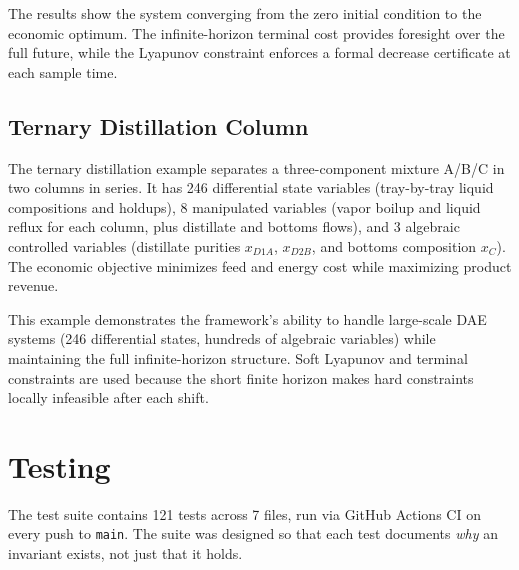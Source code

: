 \documentclass[11pt,letterpaper]{article}
\begin{document}
The results show the system converging from the zero initial condition to the economic optimum. The infinite-horizon terminal cost provides foresight over the full future, while the Lyapunov constraint enforces a formal decrease certificate at each sample time.

\subsection{Ternary Distillation Column}

The ternary distillation example separates a three-component mixture A/B/C in two columns in series. It has 246 differential state variables (tray-by-tray liquid compositions and holdups), 8 manipulated variables (vapor boilup and liquid reflux for each column, plus distillate and bottoms flows), and 3 algebraic controlled variables (distillate purities $x_{D1A}$, $x_{D2B}$, and bottoms composition $x_C$). The economic objective minimizes feed and energy cost while maximizing product revenue.

This example demonstrates the framework's ability to handle large-scale DAE systems (246 differential states, hundreds of algebraic variables) while maintaining the full infinite-horizon structure. Soft Lyapunov and terminal constraints are used because the short finite horizon makes hard constraints locally infeasible after each shift.

\section{Testing}

The test suite contains 121 tests across 7 files, run via GitHub Actions CI on every push to \texttt{main}. The suite was designed so that each test documents \emph{why} an invariant exists, not just that it holds.
\end{document}
